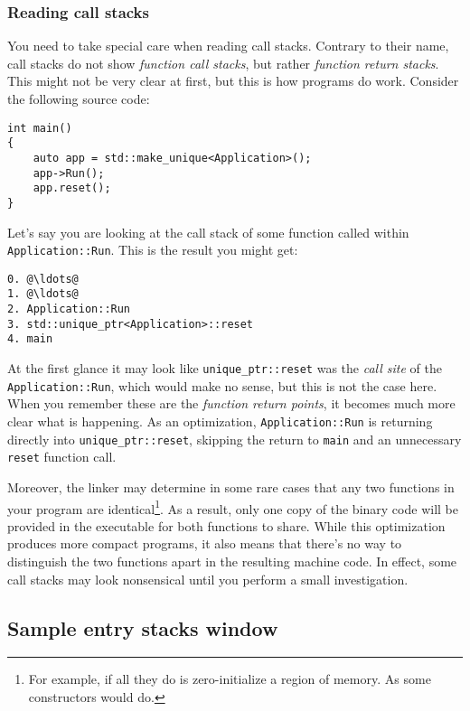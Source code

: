 \documentclass[hidelinks,titlepage,a4paper,twoside]{article}
\begin{document}
\subsubsection{Reading call stacks}
\label{readingcallstacks}

You need to take special care when reading call stacks. Contrary to their name, call stacks do not show \emph{function call stacks}, but rather \emph{function return stacks}. This might not be very clear at first, but this is how programs do work. Consider the following source code:

\begin{lstlisting}
int main()
{
    auto app = std::make_unique<Application>();
    app->Run();
    app.reset();
}
\end{lstlisting}

Let's say you are looking at the call stack of some function called within \texttt{Application::Run}. This is the result you might get:

\begin{lstlisting}
0. @\ldots@
1. @\ldots@
2. Application::Run
3. std::unique_ptr<Application>::reset
4. main
\end{lstlisting}

At the first glance it may look like \texttt{unique\_ptr::reset} was the \emph{call site} of the \texttt{Application::Run}, which would make no sense, but this is not the case here. When you remember these are the \emph{function return points}, it becomes much more clear what is happening. As an optimization, \texttt{Application::Run} is returning directly into \texttt{unique\_ptr::reset}, skipping the return to \texttt{main} and an unnecessary \texttt{reset} function call.

Moreover, the linker may determine in some rare cases that any two functions in your program are identical\footnote{For example, if all they do is zero-initialize a region of memory. As some constructors would do.}. As a result, only one copy of the binary code will be provided in the executable for both functions to share. While this optimization produces more compact programs, it also means that there's no way to distinguish the two functions apart in the resulting machine code. In effect, some call stacks may look nonsensical until you perform a small investigation.

\subsection{Sample entry stacks window}
\label{sampleparents}
\end{document}
